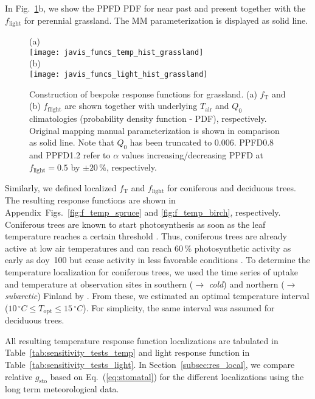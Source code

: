 \documentclass[bg, manuscript]{copernicus}
\begin{document}
In Fig.~\ref{fig:f_temp_grassland}b, we show the PPFD PDF for near past and present together with the $f_\mathrm{light}$ for perennial grassland. The MM parameterization is displayed as solid line. 

\begin{figure}[t]
  \centering
  (a)\\
  \texttt{[image: javis\_funcs\_temp\_hist\_grassland]}\\
  (b)\\
  \texttt{[image: javis\_funcs\_light\_hist\_grassland]}
\caption{Construction of bespoke response functions for grassland. (a) $f_\mathrm{T}$ and (b) $f_\mathrm{flight}$ are shown together with underlying $T_\mathrm{air}$ and $Q_0$ climatologies (probability density function - PDF), respectively. Original mapping manual parameterization is shown in comparison as solid line. Note that $Q_0$ has been truncated to $0.006$. PPFD0.8 and PPFD1.2 refer to $\alpha$ values increasing/decreasing PPFD at $f_\mathrm{light}=0.5$ by $\pm 20\,\%$, respectively.}
\label{fig:f_temp_grassland}
\end{figure}

Similarly, we defined localized $f_\mathrm{T}$ and $f_\mathrm{light}$ for coniferous and deciduous trees. The resulting response functions are shown in Appendix~Figs.~\ref{fig:f_temp_spruce} and \ref{fig:f_temp_birch}, respectively.
Coniferous trees are known to start photosynthesis as soon as the leaf temperature reaches a certain threshold \citep{TB:Kolari2007}. Thus, coniferous trees are already active at low air temperatures and can reach $60\,\unit{\%}$ photosynthetic activity as early as \unit{doy}~100 but cease activity in less favorable conditions \citep{TB:Kolari2007, TP:Wallin2013}. 
To determine the temperature localization for coniferous trees, we used the time series of  uptake and temperature at observation sites in southern ($\rightarrow$ \emph{cold}) and northern ($\rightarrow$ \emph{subarctic}) Finland by \citet{TB:Kolari2007}. From these, we estimated an optimal temperature interval ($10\,\unit{^\circ C}\le T_\mathrm{opt} \le 15\,\unit{^\circ C}$). For simplicity, the same interval was assumed for deciduous trees.

All resulting temperature response function localizations are tabulated in Table~\ref{tab:sensitivity_tests_temp} and light response function in Table~\ref{tab:sensitivity_tests_light}. In Section~\ref{subsec:res_local}, we compare relative $g_\mathrm{sto}$ based on Eq.~(\ref{eq:stomatal}) for the different localizations using the long term meteorological data.
\end{document}
